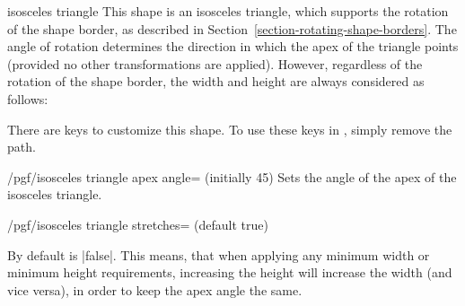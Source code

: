 \begin{shape}{isosceles triangle}
  This shape is an isosceles triangle, which supports the rotation of
  the shape border, as described in
  Section~\ref{section-rotating-shape-borders}. The angle of rotation
  determines the direction in which the apex of the triangle points
  (provided no other transformations are applied). However, regardless
  of the rotation of the shape border, the width and height are
  always considered as follows:
	
\begin{codeexample}[]
\end{codeexample}

	There are \pgfname{} keys to customize this shape.
	To use these keys in \tikzname, simply remove the 
	path.

  \begin{key}{/pgf/isosceles triangle apex angle= (initially 45)}
    Sets the angle of the apex of the isosceles triangle.
  \end{key}

\begin{key}{/pgf/isosceles triangle stretches= (default true)}

	By default  is |false|. This means, that when applying
	any minimum width or minimum height requirements, increasing the
	height will increase the width (and	vice versa), in order to keep the
	apex angle the same.

\begin{codeexample}[]
\end{codeexample}	


\end{key}
\end{shape}

